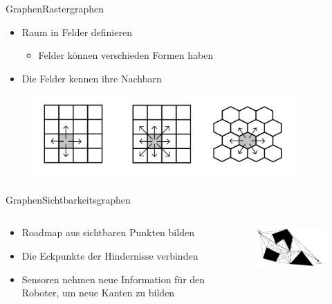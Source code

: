 \documentclass[t,aspectratio=169,dvipsnames]{beamer}
\begin{document}
\begin{frame}{Graphen}{Rastergraphen}
	\begin{itemize}
		\item Raum in Felder definieren
		\begin{itemize}
			\item Felder können verschieden Formen haben
		\end{itemize} 
		\item Die Felder kennen ihre Nachbarn
	\end{itemize}
	\begin{figure}
		\includegraphics[width=10.0cm]{images/Grid_Tiles.png}
	\end{figure}
\end{frame}

\begin{frame}{Graphen}{Sichtbarkeitsgraphen}
	\begin{columns}
		\begin{column}[T]{0.5\textwidth}
			\begin{itemize}
				\item Roadmap aus sichtbaren Punkten bilden
				\item Die Eckpunkte der Hindernisse verbinden
				\item Sensoren nehmen neue Information für den Roboter, um neue  Kanten zu bilden
			\end{itemize}
		\end{column}
		\begin{column}[T]{0.5\textwidth}
			\begin{figure}
				\includegraphics[width=6.5cm]{images/Robot_Motion_Visibility_Graph.png}
			\end{figure}
		\end{column}
	\end{columns}
\end{frame}
\end{document}

